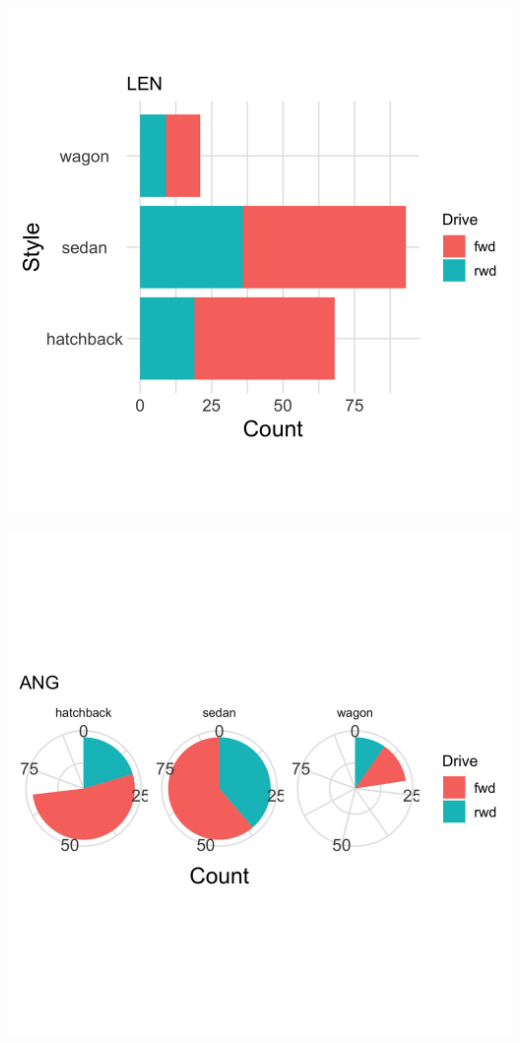 \documentclass[]{article}
\newcommand{\setwidth}{0.40\textwidth}
\begin{document}
\noindent\hrulefill

\hspace*{\fill}
\begin{minipage}{\setwidth}
  \centering
  \includegraphics[width=1.00\textwidth]{../images/03_length}
\end{minipage} %
\hfill\vline\hfill
\begin{minipage}{\setwidth}
  \centering
  \includegraphics[width=1.00\textwidth]{../images/04_angle}
\end{minipage}
\hspace*{\fill}
\end{document}

